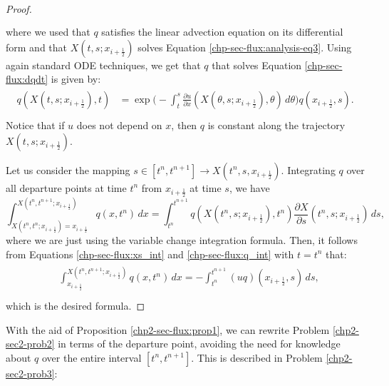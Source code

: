 \begin{proof}
\begin{align}
\begin{split}
		\end{split}
	\end{align}
	where we used that $q$ satisfies the linear advection equation on its differential form and that $X(t,s;x_{i+\frac{1}{2}})$
	solves Equation \eqref{chp-sec-flux:analysis-eq3}.
	Using again standard ODE techniques, we get that $q$ that solves Equation \eqref{chp-sec-flux:dqdt}
	is given by:
	\begin{align}
		\begin{split}
			\label{chp-sec-flux:q_int}
			q(X(t,s;x_{i+\frac{1}{2}}),t) &= 
			\exp{\bigg(-\int_{t}^{s} \frac{\partial u}{\partial x}(X(\theta,s;x_{i+\frac{1}{2}}),\theta)  \,d\theta \bigg)}
			q(x_{i+\frac{1}{2}},s).\\
		\end{split}
	\end{align}
	Notice that if $u$ does not depend on $x$, then $q$ is constant along the trajectory $X(t,s;x_{i+\frac{1}{2}})$.
	
	Let us consider the mapping $s\in[t^n,t^{n+1}] \to X(t^n,s,x_{i+\frac{1}{2}})$. 
	Integrating $q$ over all departure points at time $t^n$ from $x_{i+\frac{1}{2}}$ at time $s$, we have
	\begin{equation}
		\label{chp-sec-flux:depint_1}
		\int^{X(t^n,t^{n+1};x_{i+\frac{1}{2}})}_{X(t^n,t^{n};x_{i+\frac{1}{2}}) = x_{i+\frac{1}{2}}} q(x,t^n)\,dx 
		= \int_{t^n}^{t^{n+1}} q(X(t^n,s;x_{i+\frac{1}{2}}),t^n) \frac{\partial X}{\partial s} (t^n,s;x_{i+\frac{1}{2}})\,ds,
	\end{equation}
	where we are just using the variable change integration formula.
	Then, it follows from Equations  \eqref{chp-sec-flux:xs_int}
	and \eqref{chp-sec-flux:q_int} with $t=t^n$ that:
	\begin{align*}
		\label{chp-sec-flux:depint_2}
		\begin{split}
			&\int^{X(t^n,t^{n+1};x_{i+\frac{1}{2}})}_{x_{i+\frac{1}{2}}} q(x,t^n)\,dx 
			= -\int_{t^n}^{t^{n+1}} (uq)(x_{i+\frac{1}{2}},s) \,ds, \\ 
		\end{split}
	\end{align*}
	which is the desired formula.
\end{proof}
With the aid of Proposition \ref{chp2-sec-flux:prop1}, we can rewrite Problem \ref{chp2-sec2-prob2}
in terms of the departure point, avoiding the need for knowledge about $q$ over the
entire interval $[t^n, t^{n+1}]$. This is described in Problem \ref{chp2-sec2-prob3}:
